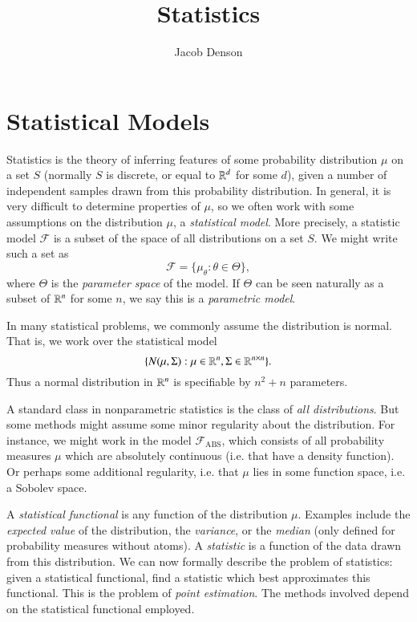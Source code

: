 

\title{Statistics}
\author{Jacob Denson}



\maketitle
\tableofcontents
{}

\chapter{Statistical Models}

Statistics is the theory of inferring features of some probability distribution $\mu$ on a set $S$ (normally $S$ is discrete, or equal to $\operatorname{\mathbb{R}}^d$ for some $d$), given a number of independent samples drawn from this probability distribution. In general, it is very difficult to determine properties of $\mu$, so we often work with some assumptions on the distribution $\mu$, a \emph{statistical model}. More precisely, a statistic model $\mathcal{F}$ is a subset of the space of all distributions on a set $S$. We might write such a set as
%
\[ \mathcal{F} = \{ \mu_\theta : \theta \in \Theta \}, \]
%
where $\Theta$ is the \emph{parameter space} of the model. If $\Theta$ can be seen naturally as a subset of $\operatorname{\mathbb{R}}^n$ for some $n$, we say this is a \emph{parametric model}.

\begin{example}
    In many statistical problems, we commonly assume the distribution is normal. That is, we work over the statistical model
    \[ \{ N(\mu,\Sigma): \mu \in \operatorname{\mathbb{R}}^n, \Sigma \in \operatorname{\mathbb{R}}^{n \times n} \}. \]
    Thus a normal distribution in $\operatorname{\mathbb{R}}^n$ is specifiable by $n^2 + n$ parameters.
\end{example}

\begin{example}
	A standard class in nonparametric statistics is the class of \emph{all distributions}. But some methods might assume some minor regularity about the distribution. For instance, we might work in the model $\mathcal{F}_{\text{ABS}}$, which consists of all probability measures $\mu$ which are absolutely continuous (i.e. that have a density function). Or perhaps some additional regularity, i.e. that $\mu$ lies in some function space, i.e. a Sobolev space.
\end{example}

A \emph{statistical functional} is any function of the distribution $\mu$. Examples include the \emph{expected value} of the distribution, the \emph{variance}, or the \emph{median} (only defined for probability measures without atoms). A \emph{statistic} is a function of the data drawn from this distribution. We can now formally describe the problem of statistics: given a statistical functional, find a statistic which best approximates this functional. This is the problem of \emph{point estimation}. The methods involved depend on the statistical functional employed.

